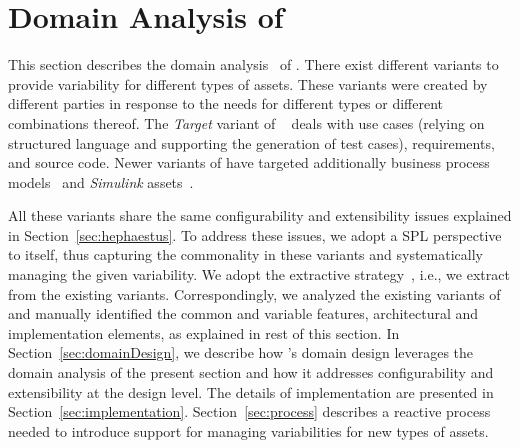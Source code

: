 
\section{Domain Analysis of \hpl}
\label{sec:domainAnalysis}

This section describes the domain analysis~\cite{gpbook} of \hpl. There exist different \hp{} variants to provide variability for different types of assets. These variants were created by different parties in response to the needs for different types or different combinations thereof. The \emph{Target} variant of \hp~\cite{ferreira:2010} deals with use cases (relying on structured language and supporting the generation of test cases), requirements, and source code. Newer variants of \hp{} have targeted additionally business process models~\cite{Machado:2011:MVB:1960502.1960508} and \emph{Simulink} assets~\cite{simulink}.

All these variants share the same configurability and extensibility issues explained in Section~\ref{sec:hephaestus}. To address these issues, we adopt a SPL perspective to \hp{} itself, thus capturing the commonality in these variants and systematically managing the given variability. We adopt the extractive strategy~\cite{kruegerPFE01}, i.e., we extract \hpl{} from the existing \hp{} variants. Correspondingly, we analyzed the existing variants of \hp{} and manually identified the common and variable features, architectural and implementation elements, as explained in rest of this section. In Section~\ref{sec:domainDesign}, we describe how \hpl's domain design leverages the domain analysis of the present section and how it addresses configurability and extensibility at the design level. The details of implementation are presented in Section~\ref{sec:implementation}. Section~\ref{sec:process} describes a reactive process needed to introduce support for managing variabilities for new types of assets.


